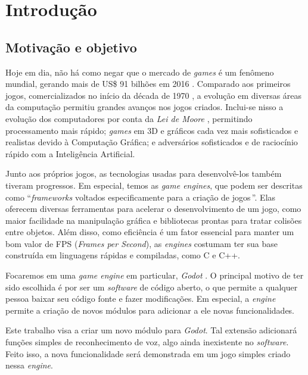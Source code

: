 \chapter{Introdução}
\label{cap:introduction}


\section{Motivação e objetivo}

Hoje em dia, não há como negar que o mercado de \emph{games} é um fenômeno mundial,
gerando mais de US\$ 91 bilhões em 2016 \citep{gameMarket:16}. Comparado aos
primeiros jogos, comercializados no início da década de 1970
\citep{gameMarketOrigin}, a evolução em diversas áreas da computação permitiu
grandes avanços nos jogos criados. Inclui-se nisso a evolução dos computadores por
conta da \emph{Lei de Moore} \citep{moore}, permitindo processamento mais rápido;
\emph{games} em 3D e gráficos cada vez mais sofisticados e realistas devido à
Computação Gráfica; e adversários sofisticados e de raciocínio rápido com a
Inteligência Artificial.

Junto aos próprios jogos, as tecnologias usadas para desenvolvê-los também tiveram
progressos. Em especial, temos as \emph{game engines}, que podem ser descritas como
\textquotedblleft \emph{frameworks} voltados especificamente para a criação de
jogos\,\textquotedblright\:\citep{gameEngine:13}. Elas oferecem diversas ferramentas
para acelerar o desenvolvimento de um jogo, como maior facilidade na manipulação
gráfica e bibliotecas prontas para tratar colisões entre objetos. Além disso, como
eficiência é um fator essencial para manter um bom valor de FPS (\emph{Frames per
Second}), as \emph{engines} costumam ter sua base construída em linguagens rápidas e
compiladas, como C e C++.

Focaremos em uma \emph{game engine} em particular, \emph{Godot} \citep{godot}. O
principal motivo de ter sido escolhida é por ser um \emph{software} de código
aberto, o que permite a qualquer pessoa baixar seu código fonte e fazer
modificações. Em especial, a \emph{engine} permite a criação de novos módulos para
adicionar a ele novas funcionalidades.

Este trabalho visa a criar um novo módulo para \emph{Godot}. Tal extensão adicionará
funções simples de reconhecimento de voz, algo ainda inexistente no \emph{software}.
Feito isso, a nova funcionalidade será demonstrada em um jogo simples criado nessa
\emph{engine}.

